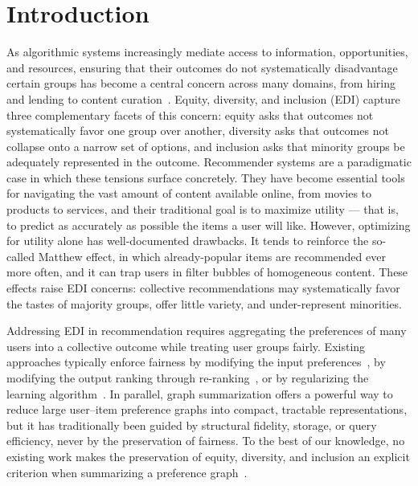 \documentclass[runningheads]{llncs}
\begin{document}
\section{Introduction}

As algorithmic systems increasingly mediate access to information, opportunities,
and resources, ensuring that their outcomes do not systematically disadvantage
certain groups has become a central concern across many domains, from hiring and
lending to content curation~\cite{mehrabi2021survey}. Equity, diversity, and
inclusion (EDI) capture three complementary facets of this concern: equity asks
that outcomes not systematically favor one group over another, diversity asks that
outcomes not collapse onto a narrow set of options, and inclusion asks that
minority groups be adequately represented in the outcome. Recommender systems
are a paradigmatic case in which these tensions surface concretely. They have
become essential tools for navigating the vast amount of content available online,
from movies to products to services, and their traditional goal is to maximize
utility --- that is, to predict as accurately as possible the items a user will
like. However, optimizing for utility alone has well-documented drawbacks. It
tends to reinforce the so-called Matthew effect, in which already-popular items
are recommended ever more often, and it can trap users in filter bubbles of
homogeneous content. These effects raise EDI concerns: collective recommendations
may systematically favor the tastes of majority groups, offer little variety, and
under-represent minorities.

Addressing EDI in recommendation requires aggregating the preferences of many
users into a collective outcome while treating user groups fairly. Existing
approaches typically enforce fairness by modifying the input
preferences~\cite{kamiran2012data}, by modifying the output ranking through
re-ranking~\cite{singh2018fairness}, or by regularizing the learning
algorithm~\cite{zhao_fairness_2024}. In parallel, graph summarization offers a
powerful way to reduce large user--item preference graphs into compact, tractable
representations, but it has traditionally been guided by structural fidelity,
storage, or query efficiency, never by the preservation of fairness. To the best
of our knowledge, no existing work makes the preservation of equity, diversity,
and inclusion an explicit criterion when summarizing a preference
graph~\cite{liu_graph_2018}.
\end{document}
